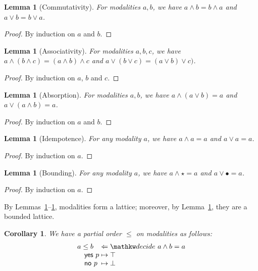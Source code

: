 \documentclass{amsart}
\makeatletter
\newtheorem{corollary}[theorem]{Corollary}
\newtheorem{lemma}[theorem]{Lemma}
\newenvironment{proofof}[1][\proofname]{%
  \par\pushQED{\qed}\normalfont%
  \topsep6\p@\@plus6\p@\relax
\trivlist\item[\hskip\labelsep\bfseries#1\@addpunct{.}]%
  \ignorespaces
}{%
  \popQED\endtrivlist\@endpefalse
}
\makeatother
\begin{document}
\begin{lemma}[Commutativity]\label{lem:modality-commutativity}
  For modalities $a, b$, we have $a\land b = b\land a$ and $a\lor b
  = b\lor a$.
\end{lemma}
\begin{proof}
  By induction on $a$ and $b$.
\end{proof}

\begin{lemma}[Associativity]\label{lem:modality-associativity}
  For modalities $a, b, c$, we have $a\land (b\land c) = (a\land b)
  \land c$ and $a\lor (b\lor c) = (a \lor b) \lor c)$.
\end{lemma}
\begin{proof}
  By induction on $a$, $b$ and $c$.
\end{proof}

\begin{lemma}[Absorption]\label{lem:modality-absorption}
  For modalities $a, b$, we have $a\land (a\lor b) = a$ and $a\lor
  (a\land b) = a$.
\end{lemma}
\begin{proof}
  By induction on $a$ and $b$.
\end{proof}

\begin{lemma}[Idempotence]\label{lem:modality-idempotence}
  For any modality $a$, we have $a\land a = a$ and $a\lor a = a$.
\end{lemma}
\begin{proof}
  By induction on $a$.
\end{proof}

\begin{lemma}[Bounding]\label{lem:modality-bounding}
  For any modality $a$, we have $a\land\star = a$ and $a\lor\bullet = a$.
\end{lemma}
\begin{proof}
  By induction on $a$.
\end{proof}

\begin{proofof}[Proof of Theorem \ref{thm:modality-is-lattice}]
  By Lemmas~\ref{lem:modality-commutativity}--\ref{lem:modality-idempotence},
  modalities form a lattice; moreover, by
  Lemma~\ref{lem:modality-bounding}, they are a bounded lattice.
\end{proofof}

\begin{corollary}
  We have a partial order $\leq$ on modalities as follows:
  \[
    \arraycolsep=1.4pt
    \begin{array}{lcl}
      a\leq b &\Leftarrow &\decide{a\land b = a}\\
      \quad \con{yes}\ p &\mapsto &\top\\
      \quad \con{no}\ p &\mapsto &\bot
    \end{array}
  \]
\end{corollary}
\end{document}
